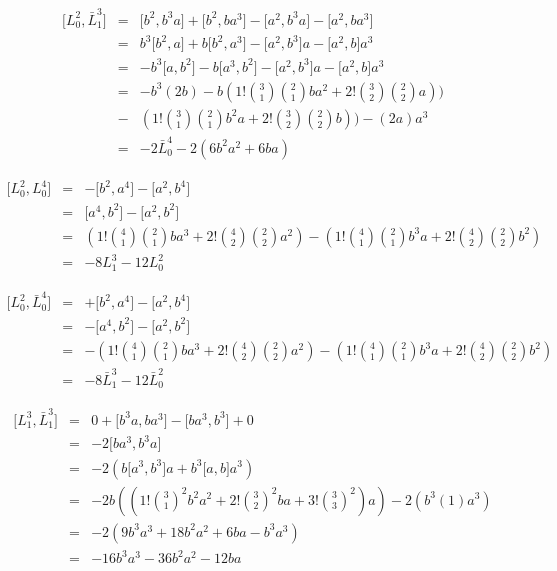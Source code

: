\documentclass{article}
\newcommand{\lrbrack}[2]{\lbrack #1 , #2 \rbrack}
\begin{document}
\begin{eqnarray*}
	\lrbrack{L_0^2}{\bar{L}_1^3} &=&  \lrbrack{b^2}{b^3 a}+ \lrbrack{b^2}{b a^3} - \lrbrack{a^2}{b^3 a} - \lrbrack{a^2}{b a^3}\\
	& = &  b^3 \lrbrack{b^2}{a} + b \lrbrack{b^2}{a^3} - \lrbrack{a^2}{b^3 }a - \lrbrack{a^2}{b }a^3\\
	& = &  -b^3 \lrbrack{a}{b^2} - b \lrbrack{a^3}{b^2} - \lrbrack{a^2}{b^3 }a - \lrbrack{a^2}{b }a^3\\
	& = & -b^3(2 b) - b(1!{3 \choose 1}{2\choose 1}b a^2 + 2!{3 \choose 2}{2\choose 2}a) )\\
	& - &  (1!{3 \choose 1}{2\choose 1}b^2 a + 2!{3 \choose 2}{2\choose 2}b)) - (2a)a^3\\
	& = & -2 \bar{L}_0^4 - 2(6 b^2 a^2 + 6 ba) 
\end{eqnarray*}


\begin{eqnarray*}
\lrbrack{L_0^2}{L_0^4} & = & -\lrbrack{b^2}{a^4} - \lrbrack{a^2}{b^4} \\
                       & = & \lrbrack{a^4}{b^2} - \lrbrack{a^2}{b^2} \\
                       & = & (1!{4 \choose 1}{2 \choose 1} ba^3 + 2!{4\choose 2}{2 \choose 2} a^2) - (1!{4 \choose 1}{2 \choose 1} b^3a + 2!{4\choose 2}{2 \choose 2} b^2)\\
                       & = & -8 L_1^3 - 12 L_0^2
\end{eqnarray*}


\begin{eqnarray*}
	\lrbrack{L_0^2}{\bar{L}_0^4} & = & +\lrbrack{b^2}{a^4} - \lrbrack{a^2}{b^4} \\
	& = & -\lrbrack{a^4}{b^2} - \lrbrack{a^2}{b^2} \\
	& = & -(1!{4 \choose 1}{2 \choose 1} ba^3 + 2!{4\choose 2}{2 \choose 2} a^2) - (1!{4 \choose 1}{2 \choose 1} b^3a + 2!{4\choose 2}{2 \choose 2} b^2)\\
	& = & -8 \bar{L}_1^3 - 12 \bar{L}_0^2
\end{eqnarray*}

\begin{eqnarray*}
	\lrbrack{L_1^3}{\bar{L}_1^3} & = & 0 +\lrbrack{b^3 a}{b a^3} - \lrbrack{b a^3}{b^3} + 0\\
	                             & = & -2 \lrbrack{ba^3}{b^3 a}\\
	                             & = & -2 (b\lrbrack{a^3}{b^3}a   + b^3 \lrbrack{a}{b} a^3)\\
	                             & = & -2 b((1!{3\choose 1}^2 b^2a^2 + 2!{3\choose 2}^2 ba + 3!{3\choose 3}^2 )a) - 2 (b^3 (1) a^3)\\
	                             & = & -2(9 b^3 a^3 + 18 b^2 a^2 + 6 ba - b^3 a^3)\\
	                             & = & -16 b^3 a^3 - 36 b^2 a^2 - 12 ba
\end{eqnarray*}
\end{document}
